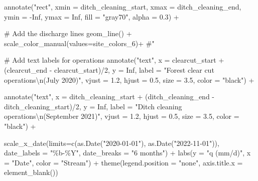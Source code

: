 \documentclass[
  letterpaper,
  DIV=11,
  numbers=noendperiod]{scrartcl}
\newenvironment{Shaded}{\begin{snugshade}}{\end{snugshade}}
\newcommand{\AttributeTok}[1]{\textcolor[rgb]{0.40,0.45,0.13}{#1}}
\newcommand{\CommentTok}[1]{\textcolor[rgb]{0.37,0.37,0.37}{#1}}
\newcommand{\ConstantTok}[1]{\textcolor[rgb]{0.56,0.35,0.01}{#1}}
\newcommand{\DecValTok}[1]{\textcolor[rgb]{0.68,0.00,0.00}{#1}}
\newcommand{\FloatTok}[1]{\textcolor[rgb]{0.68,0.00,0.00}{#1}}
\newcommand{\FunctionTok}[1]{\textcolor[rgb]{0.28,0.35,0.67}{#1}}
\newcommand{\NormalTok}[1]{\textcolor[rgb]{0.00,0.23,0.31}{#1}}
\newcommand{\SpecialCharTok}[1]{\textcolor[rgb]{0.37,0.37,0.37}{#1}}
\newcommand{\StringTok}[1]{\textcolor[rgb]{0.13,0.47,0.30}{#1}}
\begin{document}
\begin{Shaded}
\begin{Highlighting}[]
  \FunctionTok{annotate}\NormalTok{(}\StringTok{"rect"}\NormalTok{, }
           \AttributeTok{xmin =}\NormalTok{ ditch\_cleaning\_start, }\AttributeTok{xmax =}\NormalTok{ ditch\_cleaning\_end,}
           \AttributeTok{ymin =} \SpecialCharTok{{-}}\ConstantTok{Inf}\NormalTok{, }\AttributeTok{ymax =} \ConstantTok{Inf}\NormalTok{,}
           \AttributeTok{fill =} \StringTok{"gray70"}\NormalTok{, }\AttributeTok{alpha =} \FloatTok{0.3}\NormalTok{) }\SpecialCharTok{+}
  
  \CommentTok{\# Add the discharge lines}
  \FunctionTok{geom\_line}\NormalTok{() }\SpecialCharTok{+}
  \FunctionTok{scale\_color\_manual}\NormalTok{(}\AttributeTok{values=}\NormalTok{site\_colors\_6)}\SpecialCharTok{+} \CommentTok{\#"}
   
  \CommentTok{\# Add text labels for operations}
 \FunctionTok{annotate}\NormalTok{(}\StringTok{"text"}\NormalTok{, }\AttributeTok{x =}\NormalTok{ clearcut\_start }\SpecialCharTok{+}\NormalTok{ (clearcut\_end }\SpecialCharTok{{-}}\NormalTok{ clearcut\_start)}\SpecialCharTok{/}\DecValTok{2}\NormalTok{, }\AttributeTok{y =} \ConstantTok{Inf}\NormalTok{, }
           \AttributeTok{label =} \StringTok{"Forest clear cut operations}\SpecialCharTok{\textbackslash{}n}\StringTok{(July 2020)"}\NormalTok{,}
           \AttributeTok{vjust =} \FloatTok{1.2}\NormalTok{, }\AttributeTok{hjust =} \FloatTok{0.5}\NormalTok{, }\AttributeTok{size =} \FloatTok{3.5}\NormalTok{, }\AttributeTok{color =} \StringTok{"black"}\NormalTok{) }\SpecialCharTok{+}
  
  \FunctionTok{annotate}\NormalTok{(}\StringTok{"text"}\NormalTok{, }\AttributeTok{x =}\NormalTok{ ditch\_cleaning\_start }\SpecialCharTok{+}\NormalTok{ (ditch\_cleaning\_end }\SpecialCharTok{{-}}\NormalTok{    ditch\_cleaning\_start)}\SpecialCharTok{/}\DecValTok{2}\NormalTok{, }\AttributeTok{y =} \ConstantTok{Inf}\NormalTok{, }
           \AttributeTok{label =} \StringTok{"Ditch cleaning operations}\SpecialCharTok{\textbackslash{}n}\StringTok{(September 2021)"}\NormalTok{,}
           \AttributeTok{vjust =} \FloatTok{1.2}\NormalTok{, }\AttributeTok{hjust =} \FloatTok{0.5}\NormalTok{, }\AttributeTok{size =} \FloatTok{3.5}\NormalTok{, }\AttributeTok{color =} \StringTok{"black"}\NormalTok{) }\SpecialCharTok{+}
  
  \FunctionTok{scale\_x\_date}\NormalTok{(}\AttributeTok{limits=}\FunctionTok{c}\NormalTok{(}\FunctionTok{as.Date}\NormalTok{(}\StringTok{"2020{-}01{-}01"}\NormalTok{), }\FunctionTok{as.Date}\NormalTok{(}\StringTok{"2022{-}11{-}01"}\NormalTok{)),}
                 \AttributeTok{date\_labels =} \StringTok{"\%b{-}\%Y"}\NormalTok{, }\AttributeTok{date\_breaks =} \StringTok{"6 months"}\NormalTok{) }\SpecialCharTok{+}
  \FunctionTok{labs}\NormalTok{(}\AttributeTok{y =} \StringTok{"q (mm/d)"}\NormalTok{,   }\AttributeTok{x =} \StringTok{"Date"}\NormalTok{,  }\AttributeTok{color =} \StringTok{"Stream"}\NormalTok{) }\SpecialCharTok{+}
  \FunctionTok{theme}\NormalTok{(}\AttributeTok{legend.position =} \StringTok{"none"}\NormalTok{, }\AttributeTok{axis.title.x =} \FunctionTok{element\_blank}\NormalTok{())}




\end{Highlighting}
\end{Shaded}
\end{document}
